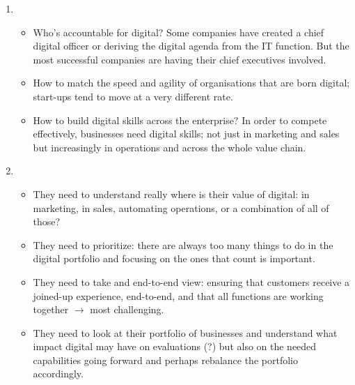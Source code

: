 \documentclass[10pt,a4paper]{report}
\begin{document}
\begin{enumerate}
\item
\begin{itemize}
\item Who's accountable for digital? Some companies have created a chief digital officer or deriving the digital agenda from the IT function. But the most successful companies are having their chief executives involved.
\item How to match the speed and agility of organisations that are born digital; start-ups tend to move at a very different rate.
\item How to build digital skills across the enterprise? In order to compete effectively, businesses need digital skills; not just in marketing and sales but increasingly in operations and across the whole value chain.
\end{itemize}
 
\item
\begin{itemize}
\item They need to understand really where is their value of digital: in marketing, in sales, automating operations, or a combination of all of those?
\item They need to prioritize: there are always too many things to do in the digital portfolio and focusing on the ones that count is important.
\item They need to take and end-to-end view: ensuring that customers receive a joined-up experience, end-to-end, and that all functions are working together $\rightarrow$ most challenging.
\item They need to look at their portfolio of businesses and understand what impact digital may have on evaluations (?) but also on the needed capabilities going forward and perhaps rebalance the portfolio accordingly.
\end{itemize}
\end{enumerate}
\end{document}
